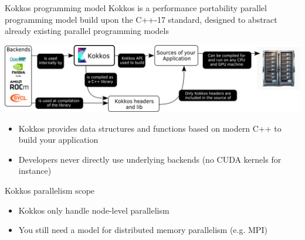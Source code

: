 \documentclass[aspectratio=169]{beamer}
\begin{document}
\begin{frame}{Kokkos programming model}
    Kokkos is a performance portability parallel programming model build upon the C++-17 standard, designed to abstract already existing parallel programming models

    \vspace{0.5em}

    \begin{center}
        \includegraphics[width=1\textwidth]{kokkos_model.png}
    \end{center}
    \begin{itemize}
        \item Kokkos provides data structures and functions based on modern C++ to build your application
        \item Developers never directly use underlying backends (no CUDA kernels for instance)
    \end{itemize}
\end{frame}


\begin{frame}{Kokkos parallelism scope}
    \begin{itemize}
        \item Kokkos only handle node-level parallelism
        \item You still need a model for distributed memory parallelism (e.g. MPI)
    \end{itemize}
\end{frame}

\end{document}
